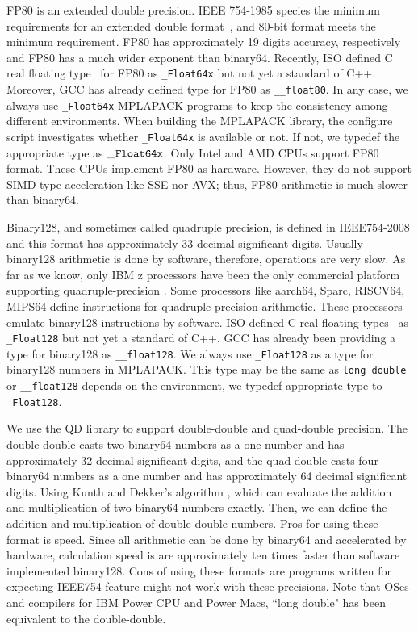 \documentclass[12pt]{article}
\begin{document}
FP80 is an extended double precision. IEEE 754-1985 species the minimum requirements for an extended double format~\cite{30711}, and 80-bit format meets the minimum requirement. FP80 has approximately 19 digits accuracy, respectively and FP80 has a much wider exponent than binary64. Recently, ISO defined C real floating type~\cite{18661-3} for FP80 as {\tt \_Float64x} but not yet a standard of C++. Moreover, GCC has already defined type for FP80 as {\tt \_\_float80}. In any case, we always use {\tt \_Float64x} MPLAPACK programs to keep the consistency among different environments. When building the MPLAPACK library, the configure script investigates whether {\tt \_Float64x} is available or not. If not, we typedef the appropriate type as ${\tt \_Float64x}$. Only Intel and AMD CPUs support FP80 format. These CPUs implement FP80 as hardware. However, they do not support SIMD-type acceleration like SSE nor AVX; thus, FP80 arithmetic is much slower than binary64.

Binary128, and sometimes called quadruple precision, is defined in IEEE754-2008 \cite{4610935} and this format has approximately 33 decimal significant digits. Usually binary128 arithmetic is done by software, therefore, operations are very slow. As far as we know, only IBM z processors have been the only commercial platform supporting quadruple-precision \cite{IBMz13}. Some processors like aarch64, Sparc, RISCV64, MIPS64 define instructions for quadruple-precision arithmetic. These processors emulate binary128 instructions by software. ISO defined C real floating types~\cite{18661-3} as {\tt \_Float128} but not yet a standard of C++. GCC has already been providing a type for binary128 as {\tt \_\_float128}. We always use {\tt \_Float128} as a type for binary128 numbers in MPLAPACK. This type may be the same as {\tt long double} or {\tt \_\_float128} depends on the environment, we typedef appropriate type to {\tt \_Float128}.
 
We use the QD library \cite{hida2000} to support double-double and quad-double precision. The double-double casts two binary64 numbers as a one number and has approximately 32 decimal significant digits, and the quad-double casts four binary64 numbers as a one number and has approximately 64 decimal significant digits. Using Kunth and Dekker's algorithm \cite{Knuth1997,Dekker1971}, which can evaluate the addition and multiplication of two binary64 numbers exactly. Then, we can define the addition and multiplication of double-double numbers. Pros for using these format is speed. Since all arithmetic can be done by binary64 and accelerated by hardware, calculation speed is are approximately ten times faster than software implemented binary128. Cons of using these formats are programs written for expecting IEEE754 feature might not work with these precisions. Note that OSes and compilers for IBM Power CPU and Power Macs, ``long double" has been equivalent to the double-double.
\end{document}
